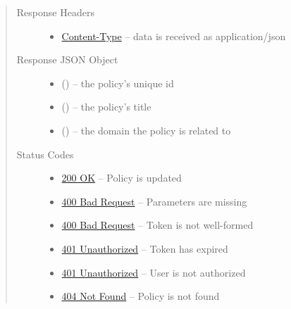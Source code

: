 \documentclass[letterpaper,10pt,english]{sphinxmanual}
\begin{document}
\begin{fulllineitems}
\begin{quote}
\begin{description}
\begin{itemize}
\end{itemize}

\item[{Response Headers}] \leavevmode\begin{itemize}
\item {} 
\href{http://tools.ietf.org/html/rfc7231\#section-3.1.1.5}{Content-Type} -- data is received as application/json

\end{itemize}

\item[{Response JSON Object}] \leavevmode\begin{itemize}
\item {} 
 () -- the policy's unique id

\item {} 
 () -- the policy's title

\item {} 
 () -- the domain the policy is related to

\end{itemize}

\item[{Status Codes}] \leavevmode\begin{itemize}
\item {} 
\href{http://www.w3.org/Protocols/rfc2616/rfc2616-sec10.html\#sec10.2.1}{200 OK} -- Policy is updated

\item {} 
\href{http://www.w3.org/Protocols/rfc2616/rfc2616-sec10.html\#sec10.4.1}{400 Bad Request} -- Parameters are missing

\item {} 
\href{http://www.w3.org/Protocols/rfc2616/rfc2616-sec10.html\#sec10.4.1}{400 Bad Request} -- Token is not well-formed

\item {} 
\href{http://www.w3.org/Protocols/rfc2616/rfc2616-sec10.html\#sec10.4.2}{401 Unauthorized} -- Token has expired

\item {} 
\href{http://www.w3.org/Protocols/rfc2616/rfc2616-sec10.html\#sec10.4.2}{401 Unauthorized} -- User is not authorized

\item {} 
\href{http://www.w3.org/Protocols/rfc2616/rfc2616-sec10.html\#sec10.4.5}{404 Not Found} -- Policy is not found

\end{itemize}

\end{description}\end{quote}

\end{fulllineitems}
\end{document}
